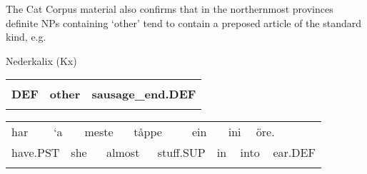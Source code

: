 \begin{styleBodyTextFirst}
The Cat Corpus material also confirms that in the northernmost provinces definite NPs containing ‘other’ tend to contain a preposed article of the standard kind, e.g. 

\end{styleBodyTextFirst}

\begin{listWWNumileveli}
\item 

\end{listWWNumileveli}

\begin{listWWNumlxivleveli}
\item 

\begin{styleExLtrTbl}
Nederkalix (Kx)

\end{styleExLtrTbl}

\end{listWWNumlxivleveli}

\begin{tabular}{lll}
\lsptoprule
\multicolumn{3}{l}{{\bfseries Den}

}\\
{\bfseries DEF} & {\bfseries other} & {\bfseries sausage\_end.DEF}\\
\lspbottomrule
\end{tabular}

\begin{tabular}{llllllllllllll}
\lsptoprule
har & \multicolumn{2}{l}{‘a

} & \multicolumn{2}{l}{meste

} & \multicolumn{2}{l}{tåppe

} & \multicolumn{2}{l}{ein

} & \multicolumn{2}{l}{ini

} & \multicolumn{2}{l}{öre.

} & \\
\multicolumn{2}{l}{have.PST

} & \multicolumn{2}{l}{she

} & \multicolumn{2}{l}{almost

} & \multicolumn{2}{l}{stuff.SUP

} & \multicolumn{2}{l}{in

} & \multicolumn{2}{l}{into

} & \multicolumn{2}{l}{ear.DEF

}\\
\lspbottomrule
\end{tabular}

